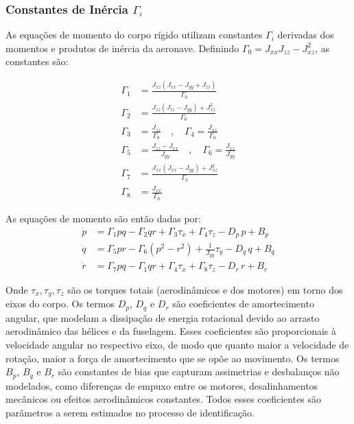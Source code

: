 \documentclass[letterpaper, 10 pt, conference]{ieeeconf}
\begin{document}
\subsubsection{Constantes de Inércia $\Gamma_i$}

As equações de momento do corpo rígido utilizam constantes $\Gamma_i$ derivadas dos momentos e produtos de inércia da aeronave. Definindo $\Gamma_0 = J_{xx} J_{zz} - J_{xz}^2$, as constantes são:

\begin{align}
\Gamma_1 &= \frac{J_{xz}(J_{xx} - J_{yy} + J_{zz})}{\Gamma_0} \\
\Gamma_2 &= \frac{J_{zz}(J_{zz} - J_{yy}) + J_{xz}^2}{\Gamma_0} \\
\Gamma_3 &= \frac{J_{zz}}{\Gamma_0} \quad , \quad
\Gamma_4 = \frac{J_{xz}}{\Gamma_0} \\
\Gamma_5 &= \frac{J_{zz} - J_{xx}}{J_{yy}} \quad , \quad
\Gamma_6 = \frac{J_{xz}}{J_{yy}} \\
\Gamma_7 &= \frac{J_{xx}(J_{xx} - J_{yy}) + J_{xz}^2}{\Gamma_0} \\
\Gamma_8 &= \frac{J_{xx}}{\Gamma_0}
\end{align}

As equações de momento são então dadas por:
\begin{align}
\dot{p} &= \Gamma_1 pq - \Gamma_2 qr + \Gamma_3 \tau_x + \Gamma_4 \tau_z - D_p\, p + B_p \\
\dot{q} &= \Gamma_5 pr - \Gamma_6 (p^2 - r^2) + \frac{1}{J_{yy}}\tau_y - D_q\, q + B_q \\
\dot{r} &= \Gamma_7 pq - \Gamma_1 qr + \Gamma_4 \tau_x + \Gamma_8 \tau_z - D_r\, r + B_r
\end{align}

Onde $\tau_x, \tau_y, \tau_z$ são os torques totais (aerodinâmicos e dos motores) em torno dos eixos do corpo. Os termos $D_p$, $D_q$ e $D_r$ são coeficientes de amortecimento angular, que modelam a dissipação de energia rotacional devido ao arrasto aerodinâmico das hélices e da fuselagem. Esses coeficientes são proporcionais à velocidade angular no respectivo eixo, de modo que quanto maior a velocidade de rotação, maior a força de amortecimento que se opõe ao movimento. Os termos $B_p$, $B_q$ e $B_r$ são constantes de bias que capturam assimetrias e desbalanços não modelados, como diferenças de empuxo entre os motores, desalinhamentos mecânicos ou efeitos aerodinâmicos constantes. Todos esses coeficientes são parâmetros a serem estimados no processo de identificação.
\end{document}
